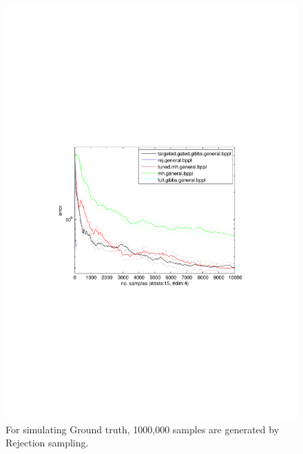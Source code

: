 \begin{figure}%
\centering
\includegraphics[width=1.2\textwidth]{pic1/data15dim4errVsamples.pdf}
\caption{\footnotesize For simulating Ground truth, 1000,000 samples are generated by Rejection sampling. }
\label{fig:pref}
\end{figure}

